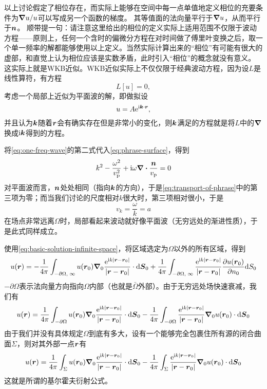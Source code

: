 \documentclass[UTF8]{ctexart}
\newcommand*{\ii}{\mathrm{i}}
\newcommand*{\ee}{\mathrm{e}}
\begin{document}
以上讨论假定了相位存在，而实际上能够在空间中每一点单值地定义相位的充要条件为$\grad{u} / u$可以写成另一个函数的梯度。
其等值面的法向量平行于$\grad{u}$，从而平行于$\vb*{n}$。
顺带提一句：请注意这里给出的相位的定义实际上适用范围不仅限于波动方程——原则上，任何一个含时的偏微分方程在对时间做了傅里叶变换之后，取一个单一频率的解都能够使用以上定义。当然实际计算出来的“相位”有可能有很大的虚部，和直觉上认为相位应该是实数矛盾，此时引入“相位”的概念就没有意义。
这实际上就是WKB近似。WKB近似实际上不仅仅限于经典波动方程，因为设$L$是线性算符，有方程
\[
    L[u] = 0,
\]
考虑一个局部上近似为平面波的解，即做拟设
\[
    u = A \ee^{\ii \vb*{k} \cdot \vb*{r}},
\]
并且认为$\vb*{k}$随着$\vb*{r}$会有确实存在但是非常小的变化，则$\vb*{k}$满足的方程就是将$L$中的$\grad$换成$\ii \vb*{k}$得到的方程。

将\eqref{eq:one-freq-wave}的第二式代入\eqref{eq:phrase-surface}，得到
\begin{equation}
    k^2 - \frac{\omega^2}{v_\text{p}^2} + \ii \omega \div{\frac{\vb*{n}}{v_\text{p}}} = 0
    \label{eq:transport-of-phrase}
\end{equation}
对平面波而言，$\vb*{n}$处处相同（指向$\vb*{k}$的方向），于是\eqref{eq:transport-of-phrase}中的第三项为零；而当我们讨论的尺度相对$k$很大时，第三项相对很小，于是
\begin{equation}
    v_k = \frac{\omega}{k} = a
\end{equation}
在场点非常远离$\Omega$时，局部看起来波动就好像平面波（无穷远处的渐进性质），于是此式同样成立。

使用\eqref{eq:basic-solution-infinite-space}，将区域选定为$\Omega$以外的所有区域，得到
\[
    u(\vb*{r}) = 
    - \frac{1}{4\pi} \int_{ - \partial \Omega, \; \infty} u(\vb*{r}_0) \grad_0{\frac{\ee^{\ii k \abs{\vb*{r} - \vb*{r}_0}}}{\abs{\vb*{r} - \vb*{r}_0}}} \cdot \dd \vb*{S}_0 
    + \frac{1}{4\pi} \int_{- \partial \Omega, \; \infty} \frac{\ee^{\ii k \abs{\vb*{r} - \vb*{r}_0}}}{\abs{\vb*{r} - \vb*{r}_0}} \pdv{u(\vb*{r}_0)}{n_0} \dd S_0
\]
$-\partial \Omega$表示法向量方向指向$\Omega$内部（也就是$\bar{\Omega}$外部）。由于无穷远处场快速衰减，我们有
\[
    u(\vb*{r}) = 
    \frac{1}{4\pi} \int_{- \partial \Omega} u(\vb*{r}_0) \grad_0{\frac{\ee^{\ii k \abs{\vb*{r} - \vb*{r}_0}}}{\abs{\vb*{r} - \vb*{r}_0}}} \cdot \dd \vb*{S}_0 
    - \frac{1}{4\pi} \int_{- \partial \Omega} \frac{\ee^{\ii k \abs{\vb*{r} - \vb*{r}_0}}}{\abs{\vb*{r} - \vb*{r}_0}} \grad_0{u(\vb*{r}_0)} \cdot \dd{\vb*{S}_0}
\]
由于我们并没有具体规定$\Omega$到底有多大，设有一个能够完全包裹住所有源的闭合曲面$\Sigma$，则对其外部一点$\vb*{r}$有
\begin{equation}
    u(\vb*{r}) = 
    \frac{1}{4\pi} \int_{\Sigma} u(\vb*{r}_0) \grad_0{\frac{\ee^{\ii k \abs{\vb*{r} - \vb*{r}_0}}}{\abs{\vb*{r} - \vb*{r}_0}}} \cdot \dd \vb*{S}_0 
    - \frac{1}{4\pi} \int_{\Sigma} \frac{\ee^{\ii k \abs{\vb*{r} - \vb*{r}_0}}}{\abs{\vb*{r} - \vb*{r}_0}} \grad_0{u(\vb*{r}_0)} \cdot \dd{\vb*{S}_0}
    \label{eq:kirchhoff-eq}
\end{equation}
这就是所谓的基尔霍夫衍射公式。
\end{document}
